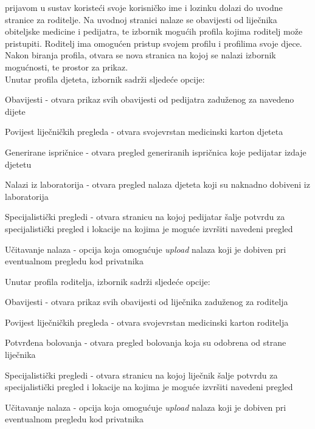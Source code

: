 		 prijavom u sustav koristeći svoje korisničko ime i lozinku dolazi do uvodne stranice za roditelje. Na uvodnoj stranici nalaze se obavijesti od liječnika obiteljske medicine i pedijatra, te izbornik mogućih profila kojima roditelj može pristupiti. Roditelj ima omogućen pristup svojem profilu i profilima svoje djece. Nakon biranja profila, otvara se nova stranica na kojoj se nalazi izbornik mogućnosti, te prostor za prikaz. \\
		Unutar profila djeteta, izbornik sadrži sljedeće opcije:
		\begin{packed_item}
			
			\item  Obavijesti - otvara prikaz svih obavijesti od pedijatra zaduženog za navedeno dijete
			\item  Povijest liječničkih pregleda - otvara svojevrstan medicinski karton djeteta
			\item  Generirane ispričnice - otvara pregled generiranih ispričnica koje pedijatar izdaje djetetu
			\item  Nalazi iz laboratorija - otvara pregled nalaza djeteta koji su naknadno dobiveni iz laboratorija
			\item  Specijalistički pregledi - otvara stranicu na kojoj pedijatar šalje potvrdu za specijalistički pregled i lokacije na kojima je moguće izvršiti navedeni pregled
			\item  Učitavanje nalaza - opcija koja omogućuje \textit{upload} nalaza koji je dobiven pri eventualnom pregledu kod privatnika
		
		\end{packed_item}
		Unutar profila roditelja, izbornik sadrži sljedeće opcije:
			\begin{packed_item}
			
			\item  Obavijesti - otvara prikaz svih obavijesti od liječnika zaduženog za roditelja
			\item  Povijest liječničkih pregleda - otvara svojevrstan medicinski karton roditelja
			\item  Potvrđena bolovanja - otvara pregled bolovanja koja su odobrena od strane liječnika
			\item  Specijalistički pregledi - otvara stranicu na kojoj liječnik šalje potvrdu za specijalistički pregled i lokacije na kojima je moguće izvršiti navedeni pregled
			\item  Učitavanje nalaza - opcija koja omogućuje \textit{upload} nalaza koji je dobiven pri eventualnom pregledu kod privatnika
			
		\end{packed_item}
		
